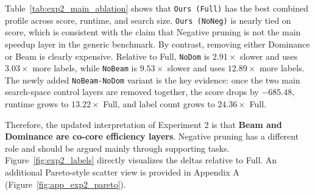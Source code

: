 \begin{table}[t]
    \centering
    \caption{Main ablation summary of Experiment 2 (task-level means over 180 \((origin, depart\_time, budget, score\_seed)\) units).}
    \label{tab:exp2_main_ablation}
\end{table}

Table~\ref{tab:exp2_main_ablation} shows that \texttt{Ours (Full)} has the best
combined profile across score, runtime, and search size.
\texttt{Ours (NoNeg)} is nearly tied on score, which is consistent with the claim
that Negative pruning is not the main speedup layer in the generic benchmark.
By contrast, removing either Dominance or Beam is clearly expensive.
Relative to Full, \texttt{NoDom} is \(2.91\times\) slower and uses \(3.03\times\) more labels,
while \texttt{NoBeam} is \(9.53\times\) slower and uses \(12.89\times\) more labels.
The newly added \texttt{NoBeam-NoDom} variant is the key evidence:
once the two main search-space control layers are removed together,
the score drops by \(-685.48\), runtime grows to \(13.22\times\) Full,
and label count grows to \(24.36\times\) Full.

Therefore, the updated interpretation of Experiment 2 is that
\textbf{Beam and Dominance are co-core efficiency layers}.
Negative pruning has a different role and should be argued mainly through supporting tasks.
Figure~\ref{fig:exp2_labels} directly visualizes
the deltas relative to Full.
An additional Pareto-style scatter view is provided in Appendix A
(Figure~\ref{fig:app_exp2_pareto}).

